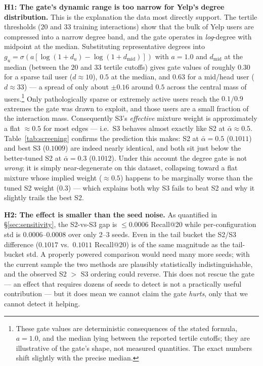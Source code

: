 \documentclass{article}
\begin{document}
\textbf{H1: The gate's dynamic range is too narrow for Yelp's degree distribution.}
This is the explanation the data most directly support. The tertile thresholds ($20$
and $33$ training interactions) show that the bulk of Yelp users are compressed into a
narrow degree band, and the gate operates in \emph{log}-degree with midpoint at the
median. Substituting representative degrees into
$g_u=\sigma(a[\log(1{+}d_u)-\log(1{+}d_{\mathrm{mid}})])$ with $a{=}1.0$ and
$d_{\mathrm{mid}}$ at the median (between the $20$ and $33$ tertile cutoffs) gives gate
values of roughly $0.30$ for a sparse tail user ($d\!\approx\!10$), $0.5$ at the median,
and $0.63$ for a mid/head user ($d\!\approx\!33$) --- a spread of only about $\pm0.16$
around $0.5$ across the central mass of users.\footnote{These gate values are
deterministic consequences of the stated formula, $a{=}1.0$, and the median lying
between the reported tertile cutoffs; they are illustrative of the gate's shape, not
measured quantities. The exact numbers shift slightly with the precise median.} Only
pathologically sparse or extremely active users reach the $0.1$/$0.9$ extremes the gate
was drawn to exploit, and those users are a small fraction of the interaction mass.
Consequently S3's \emph{effective} mixture weight is approximately a flat
$\approx\!0.5$ for most edges --- i.e.\ S3 behaves almost exactly like S2 at
$\bar\alpha\!\approx\!0.5$. Table~\ref{tab:screening} confirms the prediction this
makes: S2 at $\bar\alpha{=}0.5$ ($0.1011$) and best S3 ($0.1009$) are indeed nearly
identical, and both sit just below the better-tuned S2 at $\bar\alpha{=}0.3$
($0.1012$). Under this account the degree gate is not \emph{wrong}; it is simply
near-degenerate on this dataset, collapsing toward a flat mixture whose implied weight
($\approx\!0.5$) happens to be marginally worse than the tuned S2 weight ($0.3$) ---
which explains both why S3 fails to beat S2 and why it slightly trails the best S2.

\textbf{H2: The effect is smaller than the seed noise.} As quantified in
\S\ref{sec:sensitivity}, the S2-vs-S3 gap is $\le 0.0006$ Recall@20 while
per-configuration std is $0.0006$--$0.0008$ over only 2--3 seeds. Even in the tail
bucket the S2/S3 difference ($0.1017$ vs.\ $0.1011$ Recall@20) is of the same
magnitude as the tail-bucket std. A properly powered comparison would need many more
seeds; with the current sample the two methods are plausibly statistically
indistinguishable, and the observed S2 $>$ S3 ordering could reverse. This does not
rescue the gate --- an effect that requires dozens of seeds to detect is not a
practically useful contribution --- but it does mean we cannot claim the gate
\emph{hurts}, only that we cannot detect it helping.
\end{document}
